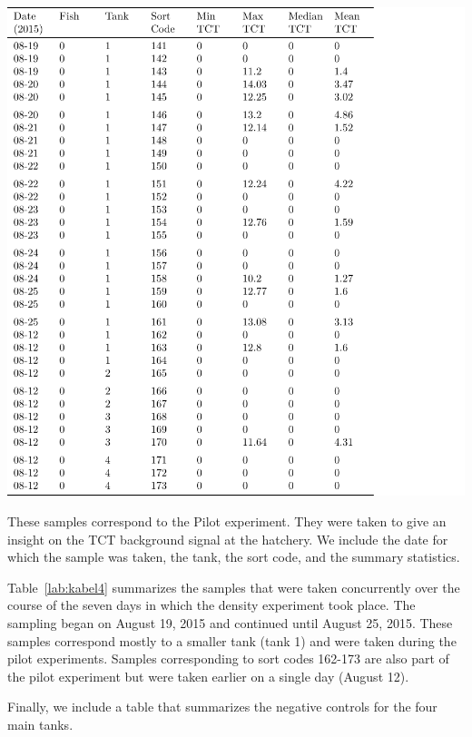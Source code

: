 \begin{table}[H]
\includegraphics{Chapter3Images/kable4new.pdf}
\caption{  \hspace{1mm}These samples correspond to the Pilot experiment. They were taken to give an insight on the TCT background signal at the hatchery. We include the date for which the sample was taken, the tank, the sort code, and the summary statistics.}
\label{lab:kabel4}
\end{table}

Table~\ref{lab:kabel4} summarizes the samples that were taken concurrently over the course of the seven days in which the density experiment took place. The sampling began on August 19, 2015 and continued until August 25, 2015. These samples correspond mostly to a smaller tank (tank 1) and were taken during the pilot experiments. Samples corresponding to sort codes 162-173 are also part of the pilot experiment but were taken earlier on a single day (August 12). 


Finally, we include a table that summarizes the negative controls for the four main tanks.

